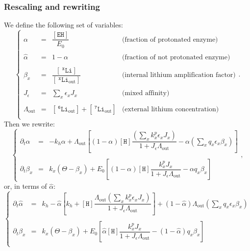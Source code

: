 \documentclass[aps,onecolumn,12pt]{revtex4}
\newcommand{\mychem}[1]{\mathtt{#1}}
\newcommand{\myconc}[1]{\left\lbrack{#1}\right\rbrack}
\newcommand{\spLi}[1]{{~^{\mychem{#1}}\mychem{Li}}}
\newcommand{\Li}[1]{\myconc{\spLi{#1}}}
\newcommand{\spLiOut}[1]{{\spLi{#1}}_{\mathrm{out}}}
\newcommand{\LiOut}[1]{\myconc{\spLiOut{#1}}}
\newcommand{\spEHin}{\mychem{EH}}
\newcommand{\EHin}{\myconc{\spEHin}}
\newcommand{\spproton}{\mychem{H}}
\newcommand{\proton}{\myconc{\spproton}}
\newcommand{\LiAll}{\Lambda}
\newcommand{\LiAllOut}{{\LiAll}_{\mathrm{out}}}
\begin{document}
\subsubsection{Rescaling and rewriting}
We define the following set of variables:
\begin{equation}
\label{eq:scale}
\left\lbrace
\begin{array}{rcll}
	\alpha & = & \dfrac{\EHin}{E_0} & \text{(fraction of protonated enzyme)}\\
	\\
	\hat\alpha & = & 1-\alpha       & \text{(fraction of not protonated enzyme)}\\
	\\
	\beta_x    & = & \dfrac{\Li{x}}{\LiOut{x}} & \text{(internal lithium amplification factor)}\\
	\\
	J_\epsilon & = & \sum_x \epsilon_x J_x & \text{(mixed affinity)}\\
	\\
	\LiAllOut  & = & \LiOut{6} + \LiOut{7} & \text{(external lithium concentration)}\\
\end{array}
\right..
\end{equation}
Then we rewrite:
\begin{equation}
\label{eq:sysnew}
\left\lbrace
\begin{array}{rcl}
	\partial_t \alpha & = & -k_h \alpha + \LiAllOut \left[ (1-\alpha) \proton  \dfrac{ \left(\sum_x k^p_x \epsilon_x J_x\right) }{1+J_\epsilon\LiAllOut}
	-\alpha  \left(\sum_x q_x \epsilon_x \beta_x \right)\right]
	\\
	\\
	\partial_t \beta_x & = & k_x\left(\Theta - \beta_x\right) +E_0\left[ (1-\alpha)  \proton \dfrac{k^p_x J_x}{1+J_\epsilon \LiAllOut} - \alpha q_x \beta_x \right]
\end{array}
\right.,
\end{equation}
or, in terms of $\hat\alpha$:
\begin{equation}
\label{eq:sysbis}
\left\lbrace
\begin{array}{rcl}
	\partial_t \hat\alpha & = & k_h  
		- \hat\alpha\left\lbrack k_h+ \proton  \dfrac{ \LiAllOut \left(\sum_x k^p_x \epsilon_x J_x\right) }{1+J_\epsilon\LiAllOut}\right] 
		+ (1-\hat\alpha) \LiAllOut\left( {\sum_x q_x \epsilon_x \beta_x} \right)
	\\
	\\
	\partial_t \beta_x & = & k_x\left(\Theta - \beta_x\right) +E_0\left[ \hat\alpha  \proton \dfrac{k^p_x J_x}{1+J_\epsilon \LiAllOut} - (1-\hat\alpha) q_x \beta_x \right]\\
\end{array}
\right.
\end{equation}
\end{document}
